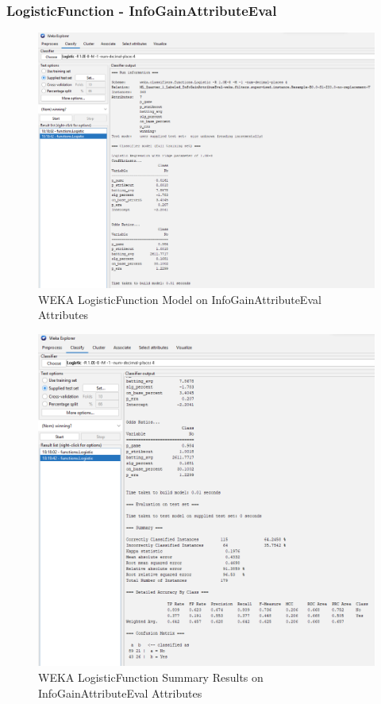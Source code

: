 \documentclass[12pt]{article}
\begin{document}
\subsubsection{LogisticFunction - InfoGainAttributeEval}
\begin{figure}[h!]
    \includegraphics[scale=0.4]{./images/InfoGainAttributeEval/LogisticFunction-Model.png}
\centering
    \caption{WEKA LogisticFunction Model on InfoGainAttributeEval Attributes}
\end{figure}
\newpage
\begin{figure}[h!]
    \includegraphics[scale=0.4]{./images/InfoGainAttributeEval/LogisticFunction-Summary.png}
\centering
    \caption{WEKA LogisticFunction Summary Results on InfoGainAttributeEval Attributes}
\end{figure}
\end{document}

